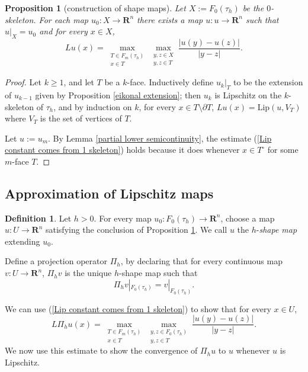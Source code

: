\documentclass[reqno,11pt]{amsart}
\newcommand{\RR}{\mathbf{R}}
\newcommand{\Lip}{\mathrm{Lip}}
\newcommand{\dfn}[1]{\emph{#1}\index{#1}}
\newtheorem{proposition}[theorem]{Proposition}
\theoremstyle{definition}
\newtheorem{definition}[theorem]{Definition}
\numberwithin{equation}{section}
\begin{document}
\begin{proposition}[construction of shape maps]\label{construction of shape maps}
Let $X := F_0(\tau_h)$ be the $0$-skeleton.
For each map $u_0: X \to \RR^n$ there exists a map $u: u \to \RR^n$ such that $u|_X = u_0$ and for every $x \in X$,
\begin{equation}\label{Lip constant comes from 1 skeleton}
Lu(x) = \max_{\substack{T \in F_m(\tau_h) \\ x \in T}} \max_{\substack{y, z \in X \\ y, z \in T}} \frac{|u(y) - u(z)|}{|y - z|}.
\end{equation}
\end{proposition}
\begin{proof}
Let $k \geq 1$, and let $T$ be a $k$-face.
Inductively define $u_k|_T$ to be the extension of $u_{k - 1}$ given by Proposition \ref{eikonal extension}; then $u_k$ is Lipschitz on the $k$-skeleton of $\tau_h$, and by induction on $k$, for every $x \in T \setminus \partial T$, $Lu(x) = \Lip(u, V_T)$ where $V_T$ is the set of vertices of $T$.

Let $u := u_m$.
By Lemma \ref{partial lower semicontinuity}, the estimate (\ref{Lip constant comes from 1 skeleton}) holds because it does whenever $x \in T^\circ$ for some $m$-face $T$.
\end{proof}

\subsection{Approximation of Lipschitz maps}
\begin{definition}\label{shape map}
Let $h > 0$.
For every map $u_0: F_0(\tau_h) \to \RR^n$, choose a map $u: U \to \RR^n$ satisfying the conclusion of Proposition \ref{construction of shape maps}.
We call $u$ the $h$-\dfn{shape map} extending $u_0$.

Define a projection operator $\Pi_h$, by declaring that for every continuous map $v: U \to \RR^n$, $\Pi_h v$ is the unique $h$-shape map such that 
$$\Pi_h v|_{F_0(\tau_h)} = v|_{F_0(\tau_h)}.$$
\end{definition}

We can use (\ref{Lip constant comes from 1 skeleton}) to show that for every $x \in U$,
\begin{equation}\label{discrete derivative is vertex lip}
L \Pi_h u(x) = \max_{\substack{T \in F_m(\tau_h) \\ x \in T}} \max_{\substack{y, z \in F_0(\tau_h) \\ y, z \in T}} \frac{|u(y) - u(z)|}{|y - z|}.
\end{equation}
We now use this estimate to show the convergence of $\Pi_h u$ to $u$ whenever $u$ is Lipschitz.
\end{document}
